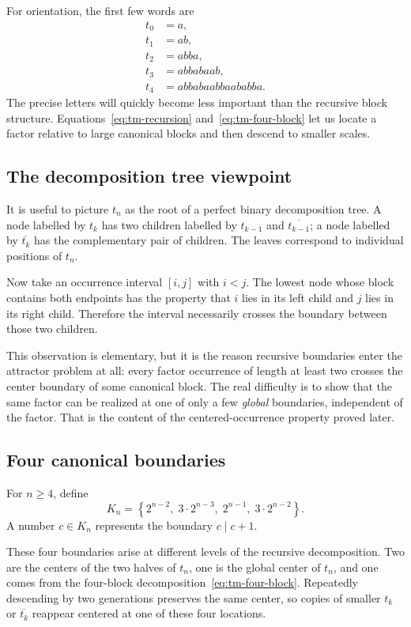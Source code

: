 \documentclass[10pt,a4paper]{article}
\theoremstyle{definition}\newtheorem{definition}[theorem]{Definition}
\theoremstyle{remark}\newtheorem{remark}[theorem]{Remark}
\begin{document}
For orientation, the first few words are
\[
\begin{aligned}
t_0&=a,\\
t_1&=ab,\\
t_2&=abba,\\
t_3&=abbabaab,\\
t_4&=abbabaabbaababba.
\end{aligned}
\]
The precise letters will quickly become less important than the recursive block structure. Equations~\eqref{eq:tm-recursion} and~\eqref{eq:tm-four-block} let us locate a factor relative to large canonical blocks and then descend to smaller scales.

\subsection{The decomposition tree viewpoint}
It is useful to picture $t_n$ as the root of a perfect binary decomposition tree. A node labelled by $t_k$ has two children labelled by $t_{k-1}$ and $\overline{t_{k-1}}$; a node labelled by $\overline{t_k}$ has the complementary pair of children. The leaves correspond to individual positions of $t_n$.

Now take an occurrence interval $[i,j]$ with $i<j$. The lowest node whose block contains both endpoints has the property that $i$ lies in its left child and $j$ lies in its right child. Therefore the interval necessarily crosses the boundary between those two children.

This observation is elementary, but it is the reason recursive boundaries enter the attractor problem at all: every factor occurrence of length at least two crosses the center boundary of some canonical block. The real difficulty is to show that the same factor can be realized at one of only a few \emph{global} boundaries, independent of the factor. That is the content of the centered-occurrence property proved later.

\subsection{Four canonical boundaries}
For $n\ge4$, define
\begin{equation}
K_n=\left\{2^{n-2},\;3\cdot2^{n-3},\;2^{n-1},\;3\cdot2^{n-2}\right\}.
\label{eq:canonical-boundaries}
\end{equation}
A number $c\in K_n$ represents the boundary $c\mid c+1$.

These four boundaries arise at different levels of the recursive decomposition. Two are the centers of the two halves of $t_n$, one is the global center of $t_n$, and one comes from the four-block decomposition~\eqref{eq:tm-four-block}. Repeatedly descending by two generations preserves the same center, so copies of smaller $t_k$ or $\overline{t_k}$ reappear centered at one of these four locations.
\end{document}
